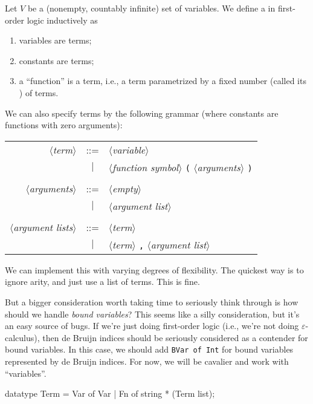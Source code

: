 

\begin{node}[Syntax]\label{fol-0001}%
\begin{definition}\label{fol-0002}%
Let $V$ be a (nonempty, countably infinite) set of variables. We define
a  in first-order logic inductively as
\begin{enumerate}
\item variables are terms;
\item constants are terms;
\item a ``function'' is a term, i.e., a term parametrized by a fixed
  number (called its ) of terms.
\end{enumerate}
We can also specify terms by the following grammar (where
constants are functions with zero arguments):
\begin{center}
\begin{tabular}{rcl}
$\langle$\textit{term}$\rangle$ & ::= & $\langle$\textit{variable}$\rangle$\\
& $|$ & $\langle$\textit{function symbol}$\rangle$ \verb#(# $\langle$\textit{arguments}$\rangle$ \verb#)#\\
  & & \\
$\langle$\textit{arguments}$\rangle$ & ::= & $\langle$\textit{empty}$\rangle$\\
  & $|$ & $\langle$\textit{argument list}$\rangle$\\
  & & \\
$\langle$\textit{argument lists}$\rangle$ & ::= & $\langle$\textit{term}$\rangle$\\
  & $|$ & $\langle$\textit{term}$\rangle$ \verb#,# $\langle$\textit{argument list}$\rangle$\\
\end{tabular}
\end{center}

\begin{node}\label{fol-000K}%
We can implement this with varying degrees of flexibility. The quickest
way is to ignore arity, and just use a list of terms. This is fine.

But a bigger consideration worth taking time to seriously think through
is how should we handle \emph{bound variables}? This seems like a silly
consideration, but it's an easy source of bugs. If we're just doing
first-order logic (i.e., we're not doing $\varepsilon$-calculus), then
de Bruijn indices should be seriously considered as a contender for
bound variables. In this case, we should add \texttt{BVar of Int}
for bound variables represented by de Bruijn indices. For now, we will
be cavalier and work with ``variables''.
\begin{sml}
datatype Term = Var of Var
              | Fn of string * (Term list);
\end{sml}
\end{node}
\end{definition}


\end{node}
